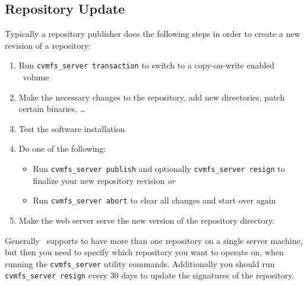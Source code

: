 \subsection{Repository Update}
Typically a repository publisher does the following steps in order to create a new revision of a repository:
\begin{enumerate}
	\item Run \texttt{cvmfs\_server transaction} to switch to a copy-on-write enabled \cvmfs\ volume
	\item Make the necessary changes to the repository, \ie add new directories, patch certain binaries, \dots
	\item Test the software installation
	\item Do one of the following:
	\begin{itemize}
		\item Run \texttt{cvmfs\_server publish} and optionally \texttt{cvmfs\_server resign} to finalize your new repository revision \emph{or}
		\item Run \texttt{cvmfs\_server abort} to clear all changes and start over again
	\end{itemize}
	\item Make the web server serve the new version of the repository directory.
\end{enumerate}

Generally \cvmfs\ supports to have more than one repository on a single server machine, but then you need to specify which repository you want to operate on, when running the \texttt{cvmfs\_server} utility commands.
Additionally you should run \texttt{cvmfs\_server resign} every 30 days to update the signatures of the repository.
